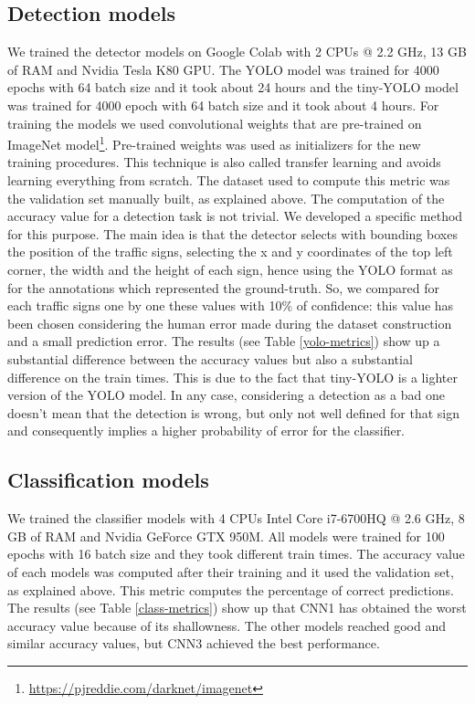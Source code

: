 \subsection{Detection models}
We trained the detector models on Google Colab with 2 CPUs @ 2.2 GHz, 13 GB of RAM and Nvidia Tesla K80 GPU. The YOLO model was trained for 4000 epochs with 64 batch size and it took about 24 hours and the tiny-YOLO model was trained for 4000 epoch with 64 batch size and it took about 4 hours.
For training  the models we used convolutional weights that are pre-trained on ImageNet model\footnote{\url{https://pjreddie.com/darknet/imagenet}}. Pre-trained weights was used as initializers for the new training procedures. This technique is also called transfer learning and avoids learning everything from scratch. The dataset used to compute this metric was the validation set manually built, as explained above. The computation of the accuracy value for a detection task is not trivial. We developed a specific method for this purpose. The main idea is that the detector selects with bounding boxes the position of the traffic signs, selecting the x and y coordinates of the top left corner, the width and the height of each sign, hence using the YOLO format as for the annotations which represented the ground-truth. So, we compared for each traffic signs one by one these values with 10\% of confidence: this value has been chosen considering the human error made during the dataset construction and a small prediction error. 
The results (see Table \ref{yolo-metrics}) show up a substantial difference between the accuracy values but also a substantial difference on the train times. This is due to the fact that tiny-YOLO is a lighter version of the YOLO model. In any case, considering a detection as a bad one doesn't mean that the detection is wrong, but only not well defined for that sign and consequently implies a higher probability of error for the classifier.


\subsection{Classification models}
We trained the classifier models with 4 CPUs Intel Core i7-6700HQ @ 2.6 GHz, 8 GB of RAM and Nvidia GeForce GTX 950M. All models were trained for 100 epochs with 16 batch size and they took different train times. The accuracy value of each models was computed after their training and it used the validation set, as explained above. This metric computes the percentage of correct predictions. The results (see Table \ref{class-metrics}) show up that CNN1 has obtained the worst accuracy value because of its shallowness. The other models reached good and similar accuracy values, but CNN3 achieved the best performance.


